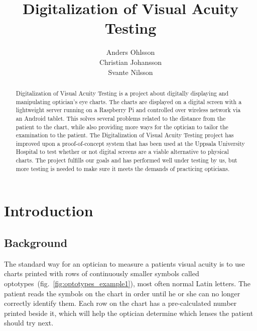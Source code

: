 \documentclass[12pt,a4paper,notitlepage]{report}
\begin{document}

\title{Digitalization of Visual Acuity Testing}
\author{Anders Ohlsson\\Christian Johansson\\Svante Nilsson}
\maketitle

\begin{abstract}
Digitalization of Visual Acuity Testing is a project about digitally displaying and manipulating optician's eye charts. The charts are displayed on a digital screen with a lightweight server running on a Raspberry Pi and controlled over wireless network via an Android tablet. This solves several problems related to the distance from the patient to the chart, while also providing more ways for the optician to tailor the examination to the patient. The Digitalization of Visual Acuity Testing project has improved upon a proof-of-concept system that has been used at the Uppsala University Hospital to test whether or not digital screens are a viable alternative to physical charts. The project fulfills our goals and has performed well under testing by us, but more testing is needed to make sure it meets the demands of practicing opticians. 
\end{abstract}
\renewcommand\thechapter{ }
\tableofcontents*
\listoffigures
\clearpage

\renewcommand\thechapter{\arabic{chapter}}
\setcounter{page}{1}
\chapter{ Introduction}
\section{Background}
The standard way for an optician to measure a patients visual acuity is to use charts printed with rows of continuously smaller symbols called optotypes~(fig.~\ref{fig:optotypes_example1}), most often normal Latin letters. The patient reads the symbols on the chart in order until he or she can no longer correctly identify them. Each row on the chart has a pre-calculated number printed beside it, which will help the optician determine which lenses the patient should try next.
\end{document}
